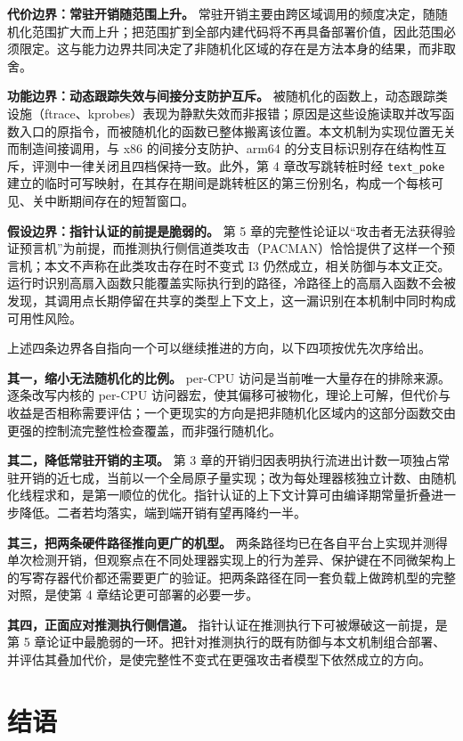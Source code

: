 \textbf{代价边界：常驻开销随范围上升。} 常驻开销主要由跨区域调用的频度决定，随随机化范围扩大而上升；把范围扩到全部内建代码将不再具备部署价值，因此范围必须限定。这与能力边界共同决定了非随机化区域的存在是方法本身的结果，而非取舍。

\textbf{功能边界：动态跟踪失效与间接分支防护互斥。} 被随机化的函数上，动态跟踪类设施（ftrace、kprobes）表现为静默失效而非报错；原因是这些设施读取并改写函数入口的原指令，而被随机化的函数已整体搬离该位置。本文机制为实现位置无关而制造间接调用，与 x86 的间接分支防护、arm64 的分支目标识别存在结构性互斥，评测中一律关闭且四档保持一致。此外，第 4 章改写跳转桩时经 \lstinline[breaklines=false]@text_poke@ 建立的临时可写映射，在其存在期间是跳转桩区的第三份别名，构成一个每核可见、关中断期间存在的短暂窗口。

\textbf{假设边界：指针认证的前提是脆弱的。} 第 5 章的完整性论证以“攻击者无法获得验证预言机”为前提，而推测执行侧信道类攻击（PACMAN\citep{ravichandran2022pacman}）恰恰提供了这样一个预言机；本文不声称在此类攻击存在时不变式 I3 仍然成立，相关防御与本文正交。运行时识别高扇入函数只能覆盖实际执行到的路径，冷路径上的高扇入函数不会被发现，其调用点长期停留在共享的类型上下文上，这一漏识别在本机制中同时构成可用性风险。

上述四条边界各自指向一个可以继续推进的方向，以下四项按优先次序给出。

\textbf{其一，缩小无法随机化的比例。} per-CPU 访问是当前唯一大量存在的排除来源。逐条改写内核的 per-CPU 访问器宏，使其偏移可被物化，理论上可解，但代价与收益是否相称需要评估；一个更现实的方向是把非随机化区域内的这部分函数交由更强的控制流完整性检查覆盖，而非强行随机化。

\textbf{其二，降低常驻开销的主项。} 第 3 章的开销归因表明执行流进出计数一项独占常驻开销的近七成，当前以一个全局原子量实现；改为每处理器核独立计数、由随机化线程求和，是第一顺位的优化。指针认证的上下文计算可由编译期常量折叠进一步降低。二者若均落实，端到端开销有望再降约一半。

\textbf{其三，把两条硬件路径推向更广的机型。} 两条路径均已在各自平台上实现并测得单次检测开销，但观察点在不同处理器实现上的行为差异、保护键在不同微架构上的写寄存器代价都还需要更广的验证。把两条路径在同一套负载上做跨机型的完整对照，是使第 4 章结论更可部署的必要一步。

\textbf{其四，正面应对推测执行侧信道。} 指针认证在推测执行下可被爆破这一前提，是第 5 章论证中最脆弱的一环。把针对推测执行的既有防御与本文机制组合部署、并评估其叠加代价，是使完整性不变式在更强攻击者模型下依然成立的方向。

\section{结语}

